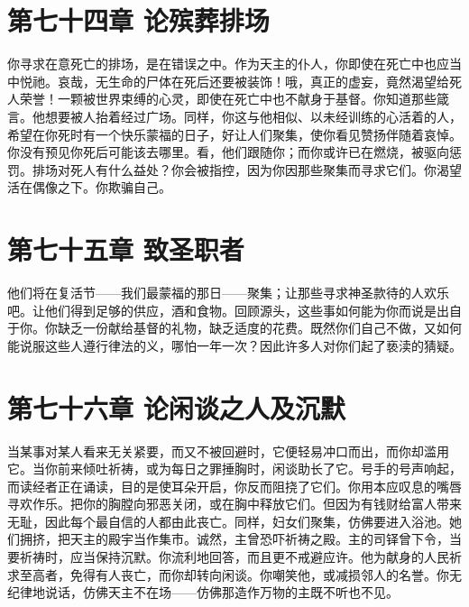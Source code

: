 
\section{第七十四章 论殡葬排场}

你寻求在意死亡的排场，是在错误之中。作为天主的仆人，你即使在死亡中也应当中悦祂。哀哉，无生命的尸体在死后还要被装饰！哦，真正的虚妄，竟然渴望给死人荣誉！一颗被世界束缚的心灵，即使在死亡中也不献身于基督。你知道那些箴言。他想要被人抬着经过广场。同样，你这与他相似、以未经训练的心活着的人，希望在你死时有一个快乐蒙福的日子，好让人们聚集，使你看见赞扬伴随着哀悼。你没有预见你死后可能该去哪里。看，他们跟随你；而你或许已在燃烧，被驱向惩罚。排场对死人有什么益处？你会被指控，因为你因那些聚集而寻求它们。你渴望活在偶像之下。你欺骗自己。\par


\section{第七十五章 致圣职者}

他们将在复活节——我们最蒙福的那日——聚集；让那些寻求神圣款待的人欢乐吧。让他们得到足够的供应，酒和食物。回顾源头，这些事如何能为你而说是出自于你。你缺乏一份献给基督的礼物，缺乏适度的花费。既然你们自己不做，又如何能说服这些人遵行律法的义，哪怕一年一次？因此许多人对你们起了亵渎的猜疑。\par


\section{第七十六章 论闲谈之人及沉默}

当某事对某人看来无关紧要，而又不被回避时，它便轻易冲口而出，而你却滥用它。当你前来倾吐祈祷，或为每日之罪捶胸时，闲谈助长了它。号手的号声响起，而读经者正在诵读，目的是使耳朵开启，你反而阻挠了它们。你用本应叹息的嘴唇寻欢作乐。把你的胸膛向邪恶关闭，或在胸中释放它们。但因为有钱财给富人带来无耻，因此每个最自信的人都由此丧亡。同样，妇女们聚集，仿佛要进入浴池。她们拥挤，把天主的殿宇当作集市。诚然，主曾恐吓祈祷之殿。主的司铎曾下令，当要祈祷时，应当保持沉默。你流利地回答，而且更不戒避应许。他为献身的人民祈求至高者，免得有人丧亡，而你却转向闲谈。你嘲笑他，或减损邻人的名誉。你无纪律地说话，仿佛天主不在场——仿佛那造作万物的主既不听也不见。\par

